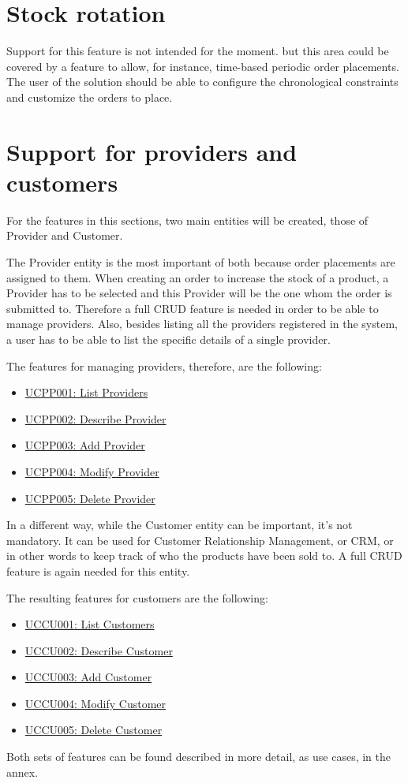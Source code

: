 \section{Stock rotation}
Support for this feature is not intended for the moment. but this area could be covered by a feature to allow, for instance, time-based periodic order placements. The user of the solution should be able to configure the chronological constraints and customize the orders to place.

\section{Support for providers and customers}
For the features in this sections, two main entities will be created, those of Provider and Customer.

The Provider entity is the most important of both because order placements are assigned to them. When creating an order to increase the stock of a product, a Provider has to be selected and this Provider will be the one whom the order is submitted to. Therefore a full CRUD feature is needed in order to be able to manage providers. Also, besides listing all the providers registered in the system, a user has to be able to list the specific details of a single provider.

The features for managing providers, therefore, are the following:
\hfill\break
\begin{itemize}
\item \hyperref[UCPP001]{UCPP001: List Providers}
\item \hyperref[UCPP002]{UCPP002: Describe Provider}
\item \hyperref[UCPP003]{UCPP003: Add Provider}
\item \hyperref[UCPP004]{UCPP004: Modify Provider}
\item \hyperref[UCPP005]{UCPP005: Delete Provider}
\end{itemize}
\hfill\break
In a different way, while the Customer entity can be important, it’s not mandatory. It can be used for Customer Relationship Management, or CRM, or in other words to keep track of who the products have been sold to. A full CRUD feature is again needed for this entity.

The resulting features for customers are the following:
\hfill\break
\begin{itemize}
\item \hyperref[UCCU001]{UCCU001: List Customers}
\item \hyperref[UCCU002]{UCCU002: Describe Customer}
\item \hyperref[UCCU003]{UCCU003: Add Customer}
\item \hyperref[UCCU004]{UCCU004: Modify Customer}
\item \hyperref[UCCU005]{UCCU005: Delete Customer}
\end{itemize}
\hfill\break
Both sets of features can be found described in more detail, as use cases, in the annex.

